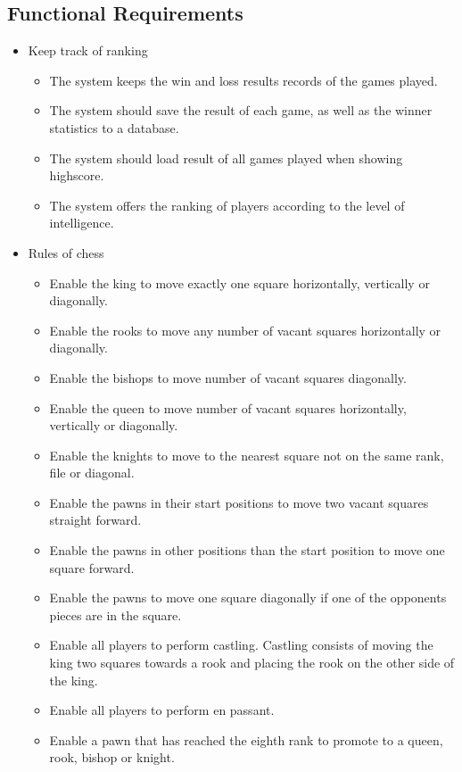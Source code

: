 \documentclass{article}
\begin{document}
\subsection{Functional Requirements}
\begin{itemize}
	\item Keep track of ranking
	\begin{itemize}
		\item The system keeps the win and loss results records of the games played.
		\item The system should save the result of each game, as well as the winner statistics to a database.
		\item The system should load result of all games played when showing highscore.
		\item The system offers the ranking of players according to the level of intelligence.
	\end{itemize}
	\item Rules of chess
	\begin{itemize}
		\item Enable the king to move exactly one square horizontally, vertically or diagonally.
		\item Enable the rooks to move any number of vacant squares horizontally or diagonally. 
		\item Enable the bishops to move number of vacant squares diagonally.
		\item Enable the queen to move number of vacant squares horizontally, vertically or diagonally.
		\item Enable the knights to move to the nearest square not on the same rank, file or diagonal. 
		\item Enable the pawns in their start positions to move two  vacant squares straight forward.
		\item Enable the pawns in other positions than the start position to move one square forward.
		\item Enable the pawns to move one square diagonally if one of the opponents pieces are in the square.
		\item Enable all players to perform castling. Castling consists of moving the king two squares towards a rook and placing the rook on the other side of the king. 
		\item Enable all players to perform en passant.
		\item Enable a pawn that has reached the eighth rank to promote to a queen, rook, bishop or knight. 
	\end{itemize}

\end{itemize}
\end{document}
